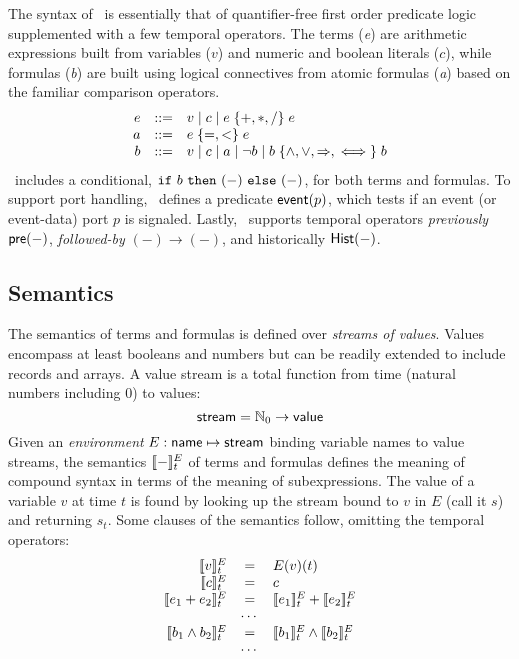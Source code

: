 The syntax of \agr\ is essentially that of quantifier-free first order
predicate logic supplemented with a few temporal operators. The terms
(\emph{e}) are arithmetic expressions built from variables ($v$) and
numeric and boolean literals ($c$), while formulas (\emph{b}) are
built using logical connectives from atomic formulas (\emph{a}) based
on the familiar comparison operators.
\[
\begin{array}{rcl}
e & ::= & v \mid c \mid e \;\{ {+,*,/} \}\; e \\
a & ::= & e\; \{ {=,<} \}\; e \\
b & ::= & v \mid c \mid a \mid \neg b
            \mid b \; \{ {\land,\lor,\Rightarrow,\iff} \}\; b
\end{array}
\]
\agr\ includes a conditional, $\mbox{$\mathtt{if}\ {b}\ \mathtt{then}\ {(-)}\ \mathtt{else}\ {(-)}$}$, for both terms
and formulas. To support port handling, \agr\ defines a predicate
$\mathsf{event}(p)$, which tests if an event (or event-data) port $p$ is
signaled. Lastly, \agr\ supports temporal operators \emph{previously}
$\mathsf{pre}(-)$, \emph{followed-by} $(-) \to (-)$, and historically
$\mathsf{Hist}(-)$.

\subsection{Semantics}
The semantics of terms and formulas is defined over \emph{streams of values}. Values encompass at
least booleans and numbers but can be readily extended to include
records and arrays. A value stream is a total function from time
(natural numbers including 0) to values:
\[
 \mathsf{stream} = \mathbb{N}_0 \to \mathsf{value}
\]
Given an \emph{environment} $E : \mathsf{name} \mapsto \mathsf{stream}$
binding variable names to value streams, the semantics $[\![ - ]\!]^E_t$
of terms and formulas defines the meaning of compound syntax in terms
of the meaning of subexpressions. The value of a variable $v$ at time
$t$ is found by looking up the stream bound to $v$ in $E$ (call it
$s$) and returning $s_t$. Some clauses of the semantics follow,
omitting the temporal operators:
\[
\begin{array}{rcl}
\sem{v}^E_t & = & E(v)(t) \\
\sem{c}^E_t & = & c \\
\sem{e_1 + e_2}^E_t & = & \sem{e_1}^E_t + \sem{e_2}^E_t \\
   & \cdots & \\
\sem{b_1 \land b_2}^E_t & = & \sem{b_1}^E_t \land \sem{b_2}^E_t \\
   & \cdots & \\
\end{array}
\]

